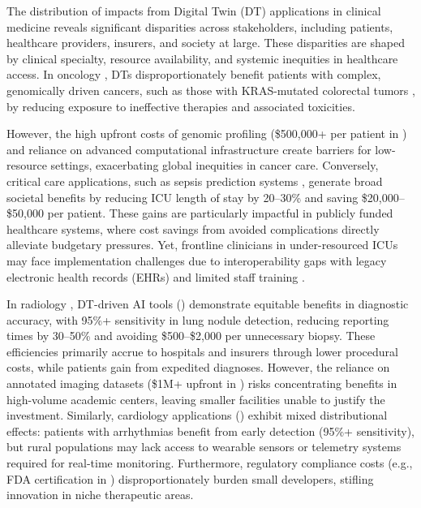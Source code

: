 \documentclass[10pt,a4paper]{article}
\begin{document}
The distribution of impacts from Digital Twin (DT) applications in clinical medicine reveals significant disparities across stakeholders, including patients, healthcare providers, insurers, and society at large. These disparities are shaped by clinical specialty, resource availability, and systemic inequities in healthcare access. In oncology , DTs disproportionately benefit patients with complex, genomically driven cancers, such as those with KRAS-mutated colorectal tumors \cite{Wang2025}, by reducing exposure to ineffective therapies and associated toxicities.

However, the high upfront costs of genomic profiling (\$500,000+ per patient in \cite{Wang2025}) and reliance on advanced computational infrastructure create barriers for low-resource settings, exacerbating global inequities in cancer care. Conversely, critical care applications, such as sepsis prediction systems \cite{Mascret2024}, generate broad societal benefits by reducing ICU length of stay by 20–30\% and saving \$20,000–\$50,000 per patient. These gains are particularly impactful in publicly funded healthcare systems, where cost savings from avoided complications directly alleviate budgetary pressures. Yet, frontline clinicians in under-resourced ICUs may face implementation challenges due to interoperability gaps with legacy electronic health records (EHRs) and limited staff training \cite{Mascret2024}.

In radiology , DT-driven AI tools (\cite{Bocean2025}) demonstrate equitable benefits in diagnostic accuracy, with 95\%+ sensitivity in lung nodule detection, reducing reporting times by 30–50\% and avoiding \$500–\$2,000 per unnecessary biopsy. These efficiencies primarily accrue to hospitals and insurers through lower procedural costs, while patients gain from expedited diagnoses. However, the reliance on annotated imaging datasets (\$1M+ upfront in \cite{Bocean2025}) risks concentrating benefits in high-volume academic centers, leaving smaller facilities unable to justify the investment. Similarly, cardiology applications (\cite{Ahmed2023}) exhibit mixed distributional effects: patients with arrhythmias benefit from early detection (95\%+ sensitivity), but rural populations may lack access to wearable sensors or telemetry systems required for real-time monitoring. Furthermore, regulatory compliance costs (e.g., FDA certification in \cite{Wang2025}) disproportionately burden small developers, stifling innovation in niche therapeutic areas.
\end{document}
